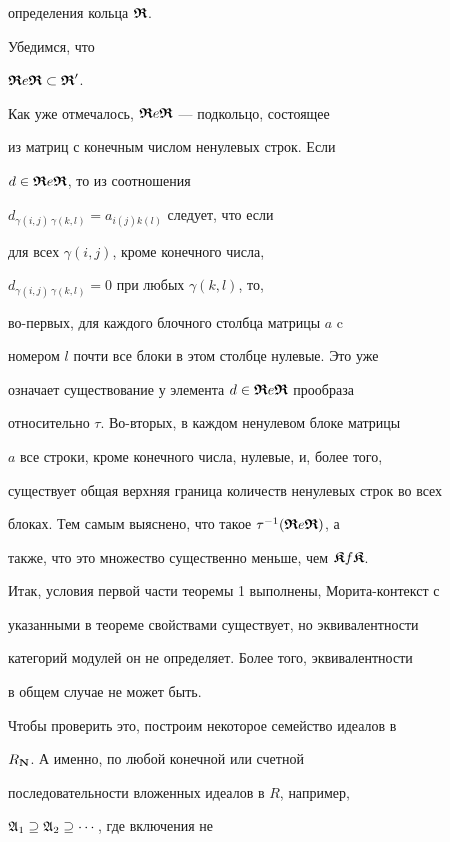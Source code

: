  определения кольца $\boldsymbol{\frak R}$.





Убедимся, что


$\boldsymbol{\frak R} e \boldsymbol{\frak R} \subset \boldsymbol{\frak R}'$.


Как уже отмечалось, $\boldsymbol{\frak R} e \boldsymbol{\frak R}$ --- подкольцо, состоящее


из матриц с конечным числом ненулевых строк. Если


$d \in \boldsymbol{\frak R} e \boldsymbol{\frak R}$, то из соотношения


$d_{\gamma(i,j)\,\gamma(k,l)}=a_{i(j)k(l)}$ следует, что если


для всех $\gamma(i,j)$, кроме конечного числа,


$d_{\gamma(i,j)\,\gamma(k,l)}=0$ при любых $\gamma(k,l)$, то,


во-первых, для каждого блочного столбца матрицы $a$ c


номером $l$ почти все блоки в этом столбце нулевые. Это уже


означает существование у элемента $d \in \boldsymbol{\frak R} e \boldsymbol{\frak R}$ прообраза


относительно $\tau$. Во-вторых, в каждом ненулевом блоке матрицы


$a$ все строки, кроме конечного числа, нулевые, и, более того,


существует общая верхняя граница количеств ненулевых строк во всех


блоках. Тем самым выяснено, что такое $\tau^{-1}(\boldsymbol{\frak R} e \boldsymbol{\frak R})$, а


также, что это множество существенно меньше, чем $\boldsymbol{\frak K} f \boldsymbol{\frak K}$.





Итак, условия первой части теоремы 1 выполнены, Морита-контекст с


указанными в теореме свойствами существует, но эквивалентности


категорий модулей он не определяет. Более того, эквивалентности


в общем случае не может быть.





Чтобы проверить это, построим некоторое семейство идеалов в


$R_{\bold N}$. А именно, по любой конечной или счетной


последовательности вложенных идеалов в $R$, например,


$\frak A_1 \supseteq \frak A_2 \supseteq \dotsb $, где включения не


